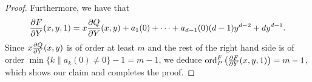\begin{proof}
	Furthermore, we have that
	\begin{equation*}
		\frac{\partial F}{\partial Y}(x, y, 1) = x\frac{\partial Q}{\partial Y}(x, y)
		+ a_1(0) + \dots + a_{d-1}(0)(d-1)y^{d-2} + dy^{d-1}.
	\end{equation*}
	Since $x\frac{\partial Q}{\partial Y}(x, y)$ is of order at least $m$ and
	the rest of the right hand side is of order
	$\min\{k \| a_k(0) \neq 0\} - 1 = m - 1$, we deduce
	$\operatorname{ord}_P^F\left(\frac{\partial F}{\partial Y}(x, y, 1)\right) = m - 1$, which shows our
	claim and completes the proof.
 \end{proof} 


